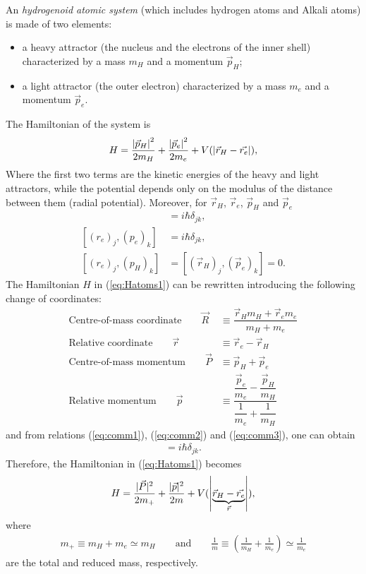 An \textit{hydrogenoid atomic system} (which includes hydrogen atoms and Alkali atoms) is made of two elements:
\begin{itemize}
    \item a heavy attractor (the nucleus and the electrons of the inner shell) characterized by a mass $m_H$ and a momentum $\vec{p}_H$; 
    \item a light attractor (the outer electron) characterized by a mass $m_e$ and a momentum $\vec{p}_e$. 
\end{itemize}
The Hamiltonian of the system is 
\begin{align}
    H = \frac{\abs{\vec{p}_H}^2}{2 m_H} + \frac{\abs{\vec{p}_e}^2}{2 m_e} + V(\abs{\vec{r}_H - \Vec{r_e}}), 
    \label{eq:Hatoms1}
\end{align}
Where the first two terms are the kinetic energies of the heavy and light attractors, while the potential depends only on the modulus of the distance between them (radial potential).
Moreover, for $\vec{r}_H$, $\vec{r}_e$, $\vec{p}_H$ and $\vec{p}_e$
\begin{align}
    [({r}_H)_j,({p}_H)_k] &= i \hbar \delta_{jk}, \label{eq:comm1} \\
    [({r}_e)_j,({p}_e)_k] &= i \hbar \delta_{jk}, \label{eq:comm2} \\
    [({r}_e)_j,({p}_H)_k] &= [(\vec{r}_H)_j,(\vec{p}_e)_k] = 0. \label{eq:comm3}
\end{align}
The Hamiltonian $H$ in (\ref{eq:Hatoms1}) can be rewritten introducing the following change of coordinates:
\begin{align*}
    \text{Centre-of-mass coordinate} \qquad \vec{R} &\equiv \dfrac{\vec{r}_H m_H + \vec{r}_e m_e }{m_H + m_e} \\
    \text{Relative coordinate} \qquad \vec{r} &\equiv \vec{r}_e - \vec{r}_H  \\
    \text{Centre-of-mass momentum} \qquad \vec{P} &\equiv \vec{p}_H + \vec{p}_e   \\
    \text{Relative momentum} \qquad \vec{p} &\equiv \dfrac{\dfrac{\vec{p}_e}{m_e} - \dfrac{\vec{p}_H}{m_H}}{\dfrac{1}{m_e} + \dfrac{1}{m_H}} 
\end{align*}
and from relations (\ref{eq:comm1}), (\ref{eq:comm2}) and (\ref{eq:comm3}), one can obtain
\begin{align}
    [R_j,P_k] = i \hbar \delta_{jk}. 
\end{align}
Therefore, the Hamiltonian in (\ref{eq:Hatoms1}) becomes
\begin{align}
    H = \frac{|{\vec{P}}|^2}{2 m_+} + \frac{|{\vec{p}}|^2}{2 m} + V(\abs{\underbrace{\vec{r}_H - \Vec{r_e}}_{\vec{r}}}), 
    \label{eq:Hatoms2}
\end{align}
where
\begin{align*}
    m_+ \equiv m_H + m_e \simeq m_H \qquad \text{and} \qquad \frac{1}{m} \equiv \left( \frac{1}{m_H} + \frac{1}{m_e}  \right) \simeq \frac{1}{m_e}
\end{align*}
are the total and reduced mass, respectively. \\

